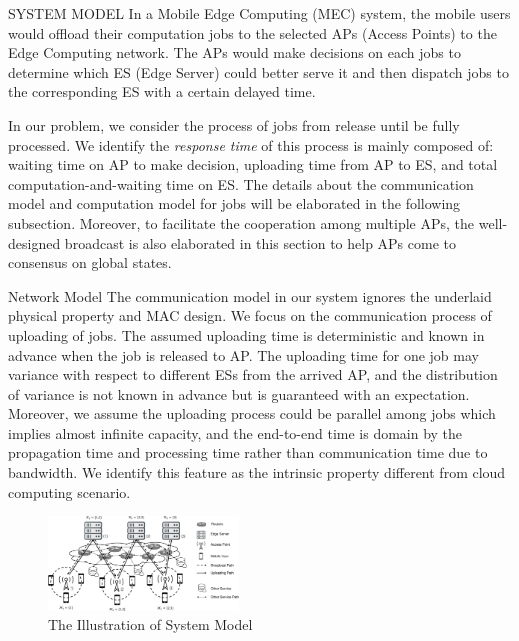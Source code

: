 \documentclass[10pt, conference, letterpaper]{IEEEtran}
\begin{document}
    \begin{section}{SYSTEM MODEL}
        In a Mobile Edge Computing (MEC) system, the mobile users would offload their computation jobs to the selected APs (Access Points) to the Edge Computing network. The APs would make decisions on each jobs to determine which ES (Edge Server) could better serve it and then dispatch jobs to the corresponding ES with a certain delayed time.
            
        In our problem, we consider the process of jobs from release until be fully processed. We identify the \emph{response time} of this process is mainly composed of: waiting time on AP to make decision, uploading time from AP to ES, and total computation-and-waiting time on ES.
        The details about the communication model and computation model for jobs will be elaborated in the following subsection. Moreover, to facilitate the cooperation among multiple APs, the well-designed broadcast is also elaborated in this section to help APs come to consensus on global states.

        \begin{subsection}{Network Model}
            The communication model in our system ignores the underlaid physical property and MAC design. We focus on the communication process of uploading of jobs.
            The assumed uploading time is deterministic and known in advance when the job is released to AP. The uploading time for one job may variance with respect to different ESs from the arrived AP, and the distribution of variance is not known in advance but is guaranteed with an expectation.
            Moreover, we assume the uploading process could be parallel among jobs which implies almost infinite capacity, and the end-to-end time is domain by the propagation time and processing time rather than communication time due to bandwidth. We identify this feature as the intrinsic property different from cloud computing scenario.
            \begin{figure}[ht]
                \centering
                \includegraphics[width=0.45\textwidth, trim={0.5cm 0.5cm 0.5cm 0.5cm}, clip]{system-model.pdf}
                \caption{The Illustration of System Model}
                \label{fig:system}
            \end{figure}
                

\end{subsection}
\end{section}
\end{document}
